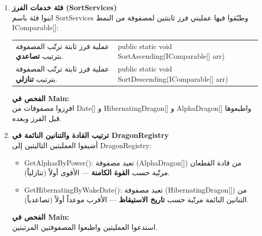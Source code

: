 \documentclass[14pt]{extarticle}
\begin{document}
\begin{enumerate}[label=\textbf{تمرين \arabic*:}, wide=0pt, leftmargin=*, itemsep=2.2em]
    \item \textbf{فئة خدمات الفرز (\textenglish{SortServices})} \\
    ابنوا فئة باسم \textenglish{SortServices} وطبّقوا فيها عمليتي فرز ثابتتين لمصفوفة من النمط \textenglish{IComparable[]}:

    {\centering
    \renewcommand{\arraystretch}{1.2}
    \small
    \begin{tabular}{|>{\raggedleft\arraybackslash}p{}|>{\raggedright\arraybackslash}p{}|}
    \hline
    \multicolumn{2}{|c|}{\textbf{الفئة: \textenglish{SortServices}}} \\
    \hline
    عملية فرز ثابتة ترتّب المصفوفة بترتيب \textbf{تصاعدي}. & \textenglish{public static void SortAscending(IComparable[] arr)} \\
    \hline
    عملية فرز ثابتة ترتّب المصفوفة بترتيب \textbf{تنازلي}. & \textenglish{public static void SortDescending(IComparable[] arr)} \\
    \hline
    \end{tabular}
    \par} %

    \vspace{2em}
    \noindent \textbf{الفحص في \textenglish{Main}:} \\
    افرِزوا مصفوفات من \textenglish{Date[]} و \textenglish{HibernatingDragon[]} و \textenglish{AlphaDragon[]} واطبعوها قبل الفرز وبعده.

    \item \textbf{ترتيب القادة والتنانين النائمة في \textenglish{DragonRegistry}} \\
    أضيفوا العمليتين التاليتين إلى \textenglish{DragonRegistry}:
    \begin{itemize}
        \item \textenglish{GetAlphasByPower()}: تعيد مصفوفة (\textenglish{AlphaDragon[]}) من قادة القطعان مرتّبة حسب \textbf{القوة الكامنة} — الأقوى أولاً (تنازلياً).
        \item \textenglish{GetHibernatingByWakeDate()}: تعيد مصفوفة (\textenglish{HibernatingDragon[]}) من التنانين النائمة مرتّبة حسب \textbf{تاريخ الاستيقاظ} — الأقرب موعداً أولاً (تصاعدياً).
    \end{itemize}
    \textbf{الفحص في \textenglish{Main}:} \\
    استدعوا العمليتين واطبعوا المصفوفتين المرتبتين.


\end{enumerate}
\end{document}

